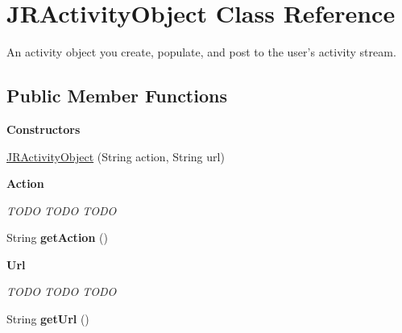 \hypertarget{classcom_1_1janrain_1_1android_1_1engage_1_1types_1_1_j_r_activity_object}{
\section{JRActivityObject Class Reference}
\label{classcom_1_1janrain_1_1android_1_1engage_1_1types_1_1_j_r_activity_object}
}


An activity object you create, populate, and post to the user's activity stream.  


\subsection*{Public Member Functions}
\begin{Indent}{\bf Constructors}\par
{\em \label{_amgrp559a25fdb98a7d1fd1c3771ac568d5e9}
 }\begin{DoxyCompactItemize}
\item 
\hyperlink{classcom_1_1janrain_1_1android_1_1engage_1_1types_1_1_j_r_activity_object_a50adc0dbac14d515124196b3f605109b}{JRActivityObject} (String action, String url)
\end{DoxyCompactItemize}
\end{Indent}
\begin{Indent}{\bf Action}\par
{\em \label{_amgrp004bf6c9a40003140292e97330236c53}
 TODO TODO TODO }\begin{DoxyCompactItemize}
\item 
\hypertarget{classcom_1_1janrain_1_1android_1_1engage_1_1types_1_1_j_r_activity_object_a86e636bbfd02a39e0d345c5b9f46fc6f}{
String {\bfseries getAction} ()}
\label{classcom_1_1janrain_1_1android_1_1engage_1_1types_1_1_j_r_activity_object_a86e636bbfd02a39e0d345c5b9f46fc6f}

\end{DoxyCompactItemize}
\end{Indent}
\begin{Indent}{\bf Url}\par
{\em \label{_amgrp02a3a357710cc2a5dfdfb74ed012fb59}
 TODO TODO TODO }\begin{DoxyCompactItemize}
\item 
\hypertarget{classcom_1_1janrain_1_1android_1_1engage_1_1types_1_1_j_r_activity_object_ad2ea28664c7db5089385e62816477d28}{
String {\bfseries getUrl} ()}
\label{classcom_1_1janrain_1_1android_1_1engage_1_1types_1_1_j_r_activity_object_ad2ea28664c7db5089385e62816477d28}

\end{DoxyCompactItemize}
\end{Indent}
